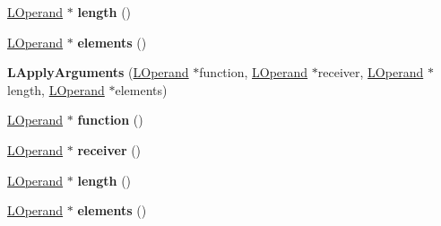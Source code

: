 \begin{DoxyCompactItemize}
\item 
\hyperlink{classv8_1_1internal_1_1_l_operand}{L\+Operand} $\ast$ {\bfseries length} ()\hypertarget{classv8_1_1internal_1_1_l_apply_arguments_a7184d82b892039d6cd4cae3b4d9f3f9d}{}\label{classv8_1_1internal_1_1_l_apply_arguments_a7184d82b892039d6cd4cae3b4d9f3f9d}

\item 
\hyperlink{classv8_1_1internal_1_1_l_operand}{L\+Operand} $\ast$ {\bfseries elements} ()\hypertarget{classv8_1_1internal_1_1_l_apply_arguments_acb08ae582ad76ef25684e2361409c0e4}{}\label{classv8_1_1internal_1_1_l_apply_arguments_acb08ae582ad76ef25684e2361409c0e4}

\item 
{\bfseries L\+Apply\+Arguments} (\hyperlink{classv8_1_1internal_1_1_l_operand}{L\+Operand} $\ast$function, \hyperlink{classv8_1_1internal_1_1_l_operand}{L\+Operand} $\ast$receiver, \hyperlink{classv8_1_1internal_1_1_l_operand}{L\+Operand} $\ast$length, \hyperlink{classv8_1_1internal_1_1_l_operand}{L\+Operand} $\ast$elements)\hypertarget{classv8_1_1internal_1_1_l_apply_arguments_a03722f1b30078ec905687e48dd73c80d}{}\label{classv8_1_1internal_1_1_l_apply_arguments_a03722f1b30078ec905687e48dd73c80d}

\item 
\hyperlink{classv8_1_1internal_1_1_l_operand}{L\+Operand} $\ast$ {\bfseries function} ()\hypertarget{classv8_1_1internal_1_1_l_apply_arguments_af7fa90a86d06b14c9991f9c68115415b}{}\label{classv8_1_1internal_1_1_l_apply_arguments_af7fa90a86d06b14c9991f9c68115415b}

\item 
\hyperlink{classv8_1_1internal_1_1_l_operand}{L\+Operand} $\ast$ {\bfseries receiver} ()\hypertarget{classv8_1_1internal_1_1_l_apply_arguments_a6cd58169b6ce998cb4a7fadaebdf8ae5}{}\label{classv8_1_1internal_1_1_l_apply_arguments_a6cd58169b6ce998cb4a7fadaebdf8ae5}

\item 
\hyperlink{classv8_1_1internal_1_1_l_operand}{L\+Operand} $\ast$ {\bfseries length} ()\hypertarget{classv8_1_1internal_1_1_l_apply_arguments_a7184d82b892039d6cd4cae3b4d9f3f9d}{}\label{classv8_1_1internal_1_1_l_apply_arguments_a7184d82b892039d6cd4cae3b4d9f3f9d}

\item 
\hyperlink{classv8_1_1internal_1_1_l_operand}{L\+Operand} $\ast$ {\bfseries elements} ()\hypertarget{classv8_1_1internal_1_1_l_apply_arguments_acb08ae582ad76ef25684e2361409c0e4}{}\label{classv8_1_1internal_1_1_l_apply_arguments_acb08ae582ad76ef25684e2361409c0e4}


\end{DoxyCompactItemize}
